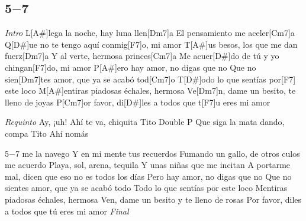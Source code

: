 \subsection{5$-$7}
\noindent

\vspace{1cm}

\begin{guitar}
	\begin{multicols}{2}
		\textit{Intro}
		L[A#]lega la noche, hay luna llen[Dm7]a
		El pensamiento me aceler[Cm7]a
		Q[D#]ue no te tengo aquí conmig[F7]o, mi amor
		T[A#]us besos, los que me dan fuerz[Dm7]a
		Y al verte, hermosa princes[Cm7]a
		Me acuer[D#]do de tú y yo chingan[F7]do, mi amor
		P[A#]ero hay amor, no digas que no
		Que no sien[Dm7]tes amor, que ya se acabó tod[Cm7]o
		T[D#]odo lo que sentías por[F7] este loco
		M[A#]entiras piadosas échales, hermosa
		Ve[Dm7]n, dame un besito, te lleno de joyas
		P[Cm7]or favor, di[D#]les a todos que t[F7]u eres mi amor
	\par
	\textit{Requinto}
	Ay, ¡uh!
	Ahí te va, chiquita
	Tito Double P
	Que siga la mata dando, compa Tito
	Ahí nomás

	\par
	5$-$7 me la navego
	Y en mi mente tus recuerdos
	Fumando un gallo, de otros culos me acuerdo
	Playa, sol, arena, tequila
	Y unas niñas que me incitan
	A portarme mal, dicen que eso no es todos los días
	Pero hay amor, no digas que no
	Que no sientes amor, que ya se acabó todo
	Todo lo que sentías por este loco
	Mentiras piadosas échales, hermosa
	Ven, dame un besito y te lleno de rosas
	Por favor, diles a todos que tú eres mi amor
		\textit{Final}
	\end{multicols}
\end{guitar}
